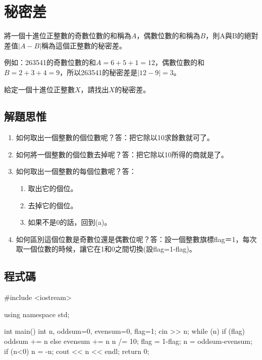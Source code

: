 \section{秘密差}

將一個十進位正整數的奇數位數的和稱為$A$，偶數位數的和稱為$B$，則A與B的絕對差值$|A-B|$稱為這個正整數的秘密差。

例如：263541的奇數位數的和$A=6+5+1=12$，偶數位數的和$B=2+3+4=9$，所以263541的秘密差是$|12-9|=3$。

給定一個十進位正整數$X$，請找出$X$的秘密差。

\subsection{解題思惟}
\begin{enumerate}
	\item 如何取出一個整數的個位數呢？答：把它除以10求餘數就可了。
	\item 如何將一個整數的個位數去掉呢？答：把它除以10所得的商就是了。
	\item 如何取出一個整數的每個位數呢？答：
	\begin{enumerate}
		\item 取出它的個位。
		\item 去掉它的個位。
		\item 如果不是0的話，回到(a)。
	\end{enumerate}
	\item 如何區別這個位數是奇數位還是偶數位呢？答：設一個整數旗標flag＝1，每次取一個位數的時候，讓它在1和0之間切換(設flag=1-flag)。
\end{enumerate}

\subsection{程式碼}
\begin{cppcode}
#include <iostream>

using namespace std;

int main()
{
    int n, oddsum=0, evensum=0, flag=1;
    cin >> n;
    while (n) {
        if (flag) oddsum += n%
        else evensum += n%
        n /= 10;
        flag = 1-flag;
    }
    n = oddsum-evensum;
    if (n<0) n = -n;
    cout << n << endl;
	return 0;
}
\end{cppcode}